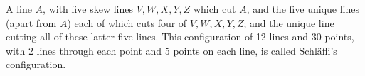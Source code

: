 A line $A$, with five skew lines $V, W, X, Y, Z$ which cut $A$, and
the five unique lines (apart from $A$) each of which cuts four
of $V, W, X, Y, Z$; and the unique line cutting all of these latter
five lines. This configuration of 12 lines and 30 points, 
with 2 lines through each point and 5 points on each line, is called 
Schl\"afli's configuration.